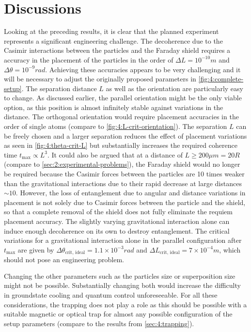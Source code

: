 \section{Discussions}\label{sec:4:discussion}
Looking at the preceding results, it is clear that the planned experiment represents a significant engineering challenge. The decoherence due to the Casimir interactions between the particles and the Faraday shield requires a accuracy in the placement of the particles in the order of $\Delta L = 10^{-10}\si{m}$ and $\Delta \theta = 10^{-9}\si{rad}$.
Achieving these accuracies appears to be very challenging and it will be necessary to adjust the originally proposed parameters in \cref{fig:4:complete-setup}. The separation distance $L$ as well as the orientation are particularly easy to change.
As discussed earlier, the parallel orientation might be the only viable option, as this position is almost infinitely stable against variations in the distance. The orthogonal orientation would require placement accuracies in the order of single atoms (compare to \cref{fig:4:L-crit-orientation}).
The separation $L$ can be freely chosen and a larger separation reduces the effect of placement variations as seen in \cref{fig:4:theta-crit-L} but substantially increases the required coherence time $t_\mathrm{max} \propto L^3$.
It could also be argued that at a distance of $L \geq 200\si{\mu m} = 20 R$ (compare to \cref{sec:2:experimental-problems}), the Faraday shield would no longer be required because the Casimir forces between the particles are 10 times weaker than the gravitational interactions due to their rapid decrease at large distances $\sim 10$.
However, the loss of entanglement due to angular and distance variations in placement is not solely due to Casimir forces between the particle and the shield, so that a complete removal of the shield does not fully eliminate the requiem placement accuracy.
The slightly varying gravitational interaction alone can induce enough decoherence on its own to destroy entanglement. 
The critical variations for a gravitational interaction alone in the parallel configuration after $t_\mathrm{max}$ are given by $\Delta \theta_\mathrm{crit,\,ideal} = 1.1 \times 10^{-3}\si{rad}$ and $\Delta L_\mathrm{crit,\,ideal} = 7\times 10^{-4}\si{m}$, which should not pose an engineering problem.

Changing the other parameters such as the particles size or superposition size might not be possible. Substantially changing both would increase the difficulty in groundstate cooling and quantum control unforeseeable.
For all these considerations, the trapping does not play a role as this should be possible with a suitable magnetic or optical trap for almost any possible configuration of the setup parameters (compare to the results from \cref{sec:4:trapping}).

